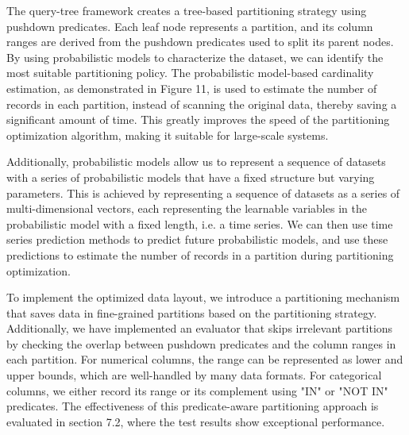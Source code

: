 The query-tree framework creates a tree-based partitioning strategy using pushdown predicates. Each leaf node represents a partition, and its column ranges are derived from the pushdown predicates used to split its parent nodes. By using probabilistic models to characterize the dataset, we can identify the most suitable partitioning policy. The probabilistic model-based cardinality estimation, as demonstrated in Figure 11, is used to estimate the number of records in each partition, instead of scanning the original data, thereby saving a significant amount of time. This greatly improves the speed of the partitioning optimization algorithm, making it suitable for large-scale systems.

Additionally, probabilistic models allow us to represent a sequence of datasets with a series of probabilistic models that have a fixed structure but varying parameters. This is achieved by representing a sequence of datasets as a series of multi-dimensional vectors, each representing the learnable variables in the probabilistic model with a fixed length, i.e. a time series. We can then use time series prediction methods to predict future probabilistic models, and use these predictions to estimate the number of records in a partition during partitioning optimization.

To implement the optimized data layout, we introduce a partitioning mechanism that saves data in fine-grained partitions based on the partitioning strategy. Additionally, we have implemented an evaluator that skips irrelevant partitions by checking the overlap between pushdown predicates and the column ranges in each partition. For numerical columns, the range can be represented as lower and upper bounds, which are well-handled by many data formats. For categorical columns, we either record its range or its complement using "IN" or "NOT IN" predicates. The effectiveness of this predicate-aware partitioning approach is evaluated in section 7.2, where the test results show exceptional performance.
